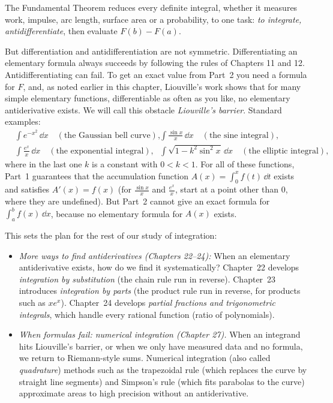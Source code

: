 \begin{connectionbox}
The Fundamental Theorem reduces every definite integral, whether it measures work,
impulse, arc length, surface area or a probability, to one task: \emph{to integrate,
antidifferentiate}, then evaluate $F(b) - F(a)$.

But differentiation and antidifferentiation are not symmetric. Differentiating an
elementary formula always succeeds by following the rules of Chapters 11 and 12.
Antidifferentiating can fail. To get an exact value from Part~2 you need a
formula for $F$, and, as noted earlier in this chapter, Liouville's work shows that
for many simple elementary functions, differentiable as often as you like, no
elementary antiderivative exists. We will call this obstacle
\emph{Liouville's barrier}. Standard examples:
\[
\begin{aligned}
  &\int e^{-x^2}\,\dd x \quad (\text{the Gaussian bell curve}), \qquad
  &&\int \frac{\sin x}{x}\,\dd x \quad (\text{the sine integral}), \\[4pt]
  &\int \frac{e^x}{x}\,\dd x \quad (\text{the exponential integral}), \qquad
  &&\int \sqrt{1 - k^2\sin^2 x}\,\dd x \quad (\text{the elliptic integral}),
\end{aligned}
\]
where in the last one $k$ is a constant with $0<k<1$.
For all of these functions, Part~1 guarantees that the accumulation function
$A(x) = \int_0^x f(t)\,\dd t$ exists and satisfies $A'(x) = f(x)$ (for
$\frac{\sin x}{x}$ and $\frac{e^x}{x}$, start at a point other than $0$, where
they are undefined). But Part~2 cannot give an exact formula for
$\int_a^b f(x)\,\dd x$, because no elementary formula for $A(x)$ exists.

This sets the plan for the rest of our study of integration:
\begin{itemize}
  \item \emph{More ways to find antiderivatives (Chapters 22--24):} When an elementary antiderivative
  exists, how do we find it systematically? Chapter~22 develops \emph{integration by
  substitution} (the chain rule run in reverse). Chapter~23
  introduces \emph{integration by parts} (the product rule run in reverse, for
  products such as $x e^x$). Chapter~24 develops \emph{partial fractions and
  trigonometric integrals}, which handle every rational function (ratio of polynomials).
  \item \emph{When formulas fail: numerical integration (Chapter 27).} When an integrand hits
  Liouville's barrier, or when we only have measured data and no formula, we
  return to Riemann-style sums. Numerical integration (also called
  \emph{quadrature}) methods such as the trapezoidal rule (which replaces the
  curve by straight line segments) and Simpson's rule
  (which fits parabolas to the curve) approximate areas to high precision without
  an antiderivative.
\end{itemize}
\end{connectionbox}


